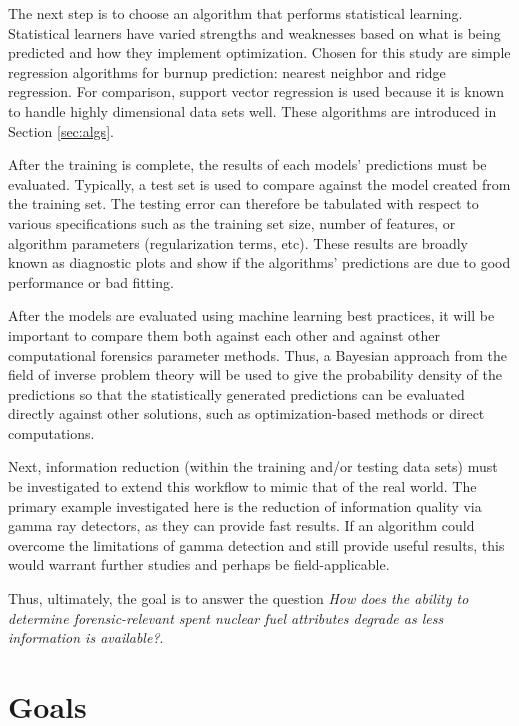 The next step is to choose an algorithm that performs statistical learning.
Statistical learners have varied strengths and weaknesses based on what is
being predicted and how they implement optimization.  Chosen for this study are
simple regression algorithms for burnup prediction: nearest neighbor and ridge
regression.  For comparison, support vector regression is used because it is
known to handle highly dimensional data sets well.  These algorithms are
introduced in Section \ref{sec:algs}.

After the training is complete, the results of each models' predictions must be
evaluated.  Typically, a test set is used to compare against the model created
from the training set.  The testing error can therefore be tabulated with
respect to various specifications such as the training set size, number of
features, or algorithm parameters (regularization terms, etc). These results
are broadly known as diagnostic plots and show if the algorithms' predictions
are due to good performance or bad fitting. 

After the models are evaluated using machine learning best practices, it will
be important to compare them both against each other and against other
computational forensics parameter methods. Thus, a Bayesian approach from the
field of inverse problem theory will be used to give the probability density of
the predictions so that the statistically generated predictions can be
evaluated directly against other solutions, such as optimization-based methods
or direct computations. 

Next, information reduction (within the training and/or testing data sets) must
be investigated to extend this workflow to mimic that of the real world. The
primary example investigated here is the reduction of information quality via
gamma ray detectors, as they can provide fast results.  If an algorithm could
overcome the limitations of gamma detection and still provide useful results,
this would warrant further studies and perhaps be field-applicable.

Thus, ultimately, the goal is to answer the question \textit{How
does the ability to determine forensic-relevant spent nuclear fuel attributes
degrade as less information is available?}. 

\section{Goals}

